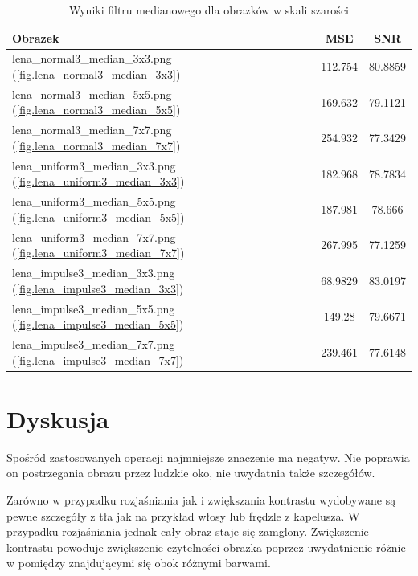 \documentclass{classrep}
\begin{document}
\begin{table}
  \centering
  \begin{tabular}{|l|c|c|}
    \hline
    \textbf{Obrazek} & \textbf{MSE} & \textbf{SNR} \\
    \hline\hline
    lena\_normal3\_median\_3x3.png (\ref{fig.lena_normal3_median_3x3}) & 112.754 & 80.8859 \\ 
    \hline 
    lena\_normal3\_median\_5x5.png (\ref{fig.lena_normal3_median_5x5}) & 169.632 & 79.1121 \\ 
    \hline 
    lena\_normal3\_median\_7x7.png (\ref{fig.lena_normal3_median_7x7}) & 254.932 & 77.3429 \\ 
    \hline 
    lena\_uniform3\_median\_3x3.png (\ref{fig.lena_uniform3_median_3x3}) & 182.968 & 78.7834 \\ 
    \hline 
    lena\_uniform3\_median\_5x5.png (\ref{fig.lena_uniform3_median_5x5}) & 187.981 & 78.666 \\ 
    \hline 
    lena\_uniform3\_median\_7x7.png (\ref{fig.lena_uniform3_median_7x7}) & 267.995 & 77.1259 \\ 
    \hline 
    lena\_impulse3\_median\_3x3.png (\ref{fig.lena_impulse3_median_3x3}) & 68.9829 & 83.0197 \\ 
    \hline 
    lena\_impulse3\_median\_5x5.png (\ref{fig.lena_impulse3_median_5x5}) & 149.28 & 79.6671 \\ 
    \hline 
    lena\_impulse3\_median\_7x7.png (\ref{fig.lena_impulse3_median_7x7}) & 239.461 & 77.6148 \\ 
    \hline 
  \end{tabular}
  \caption{Wyniki filtru medianowego dla obrazków w skali szarości}
  \label{tab.lena_median}
\end{table}

\section{Dyskusja}
Spośród zastosowanych operacji najmniejsze znaczenie ma negatyw. Nie poprawia on postrzegania obrazu przez ludzkie oko, nie uwydatnia także szczegółów.

Zarówno w przypadku rozjaśniania jak i zwiększania kontrastu wydobywane są pewne szczegóły z tła \ppauza jak na przykład włosy lub frędzle z kapelusza. W przypadku rozjaśniania jednak cały obraz staje się zamglony. Zwiększenie kontrastu powoduje zwiększenie czytelności obrazka poprzez uwydatnienie różnic w pomiędzy znajdującymi się obok różnymi barwami.
\end{document}
